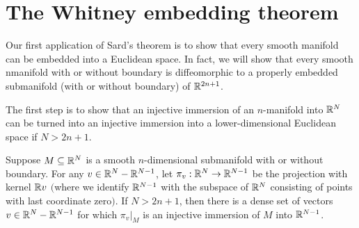 \section{The Whitney embedding theorem}
Our first application of Sard's theorem is to show that every smooth manifold can be embedded into a Euclidean space. In fact, we will show that every smooth nmanifold with or without boundary is diffeomorphic to a properly embedded submanifold (with or without boundary) of $\mathbb{R}^{2n+1}$.\par
The first step is to show that an injective immersion of an $n$-manifold into $\mathbb{R}^N$ can be turned into an injective immersion into a lower-dimensional Euclidean space if $N>2n+1$.
\begin{lemma}\label{reduce codim lem}
Suppose $M\subseteq\mathbb{R}^N$ is a smooth $n$-dimensional submanifold with or without boundary. For any $v\in\mathbb{R}^N-\mathbb{R}^{N-1}$, let $\pi_v:\mathbb{R}^N\to\mathbb{R}^{N-1}$ be the projection
with kernel $\mathbb{R} v$ $($where we identify $\mathbb{R}^{N-1}$ with the subspace of $\mathbb{R}^N$ consisting of points with last coordinate zero$)$. If $N>2n+1$, then there is a dense set of vectors $v\in\mathbb{R}^N-\mathbb{R}^{N-1}$ for which $\pi_v|_M$ is an injective immersion of $M$ into $\mathbb{R}^{N-1}$.
\end{lemma}
